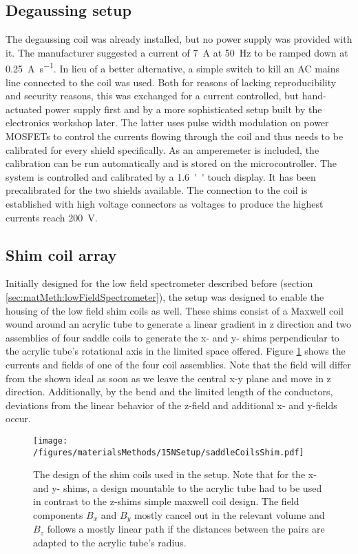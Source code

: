         \subsection{Degaussing setup}
        \label{sec:matMeth:degaussing}
        The degaussing coil was already installed, but no power supply was provided with it. The manufacturer suggested a current of \SI{7}{\ampere} at \SI{50}{\hertz} to be ramped down at \SI{0.25}{\ampere\per\second}. In lieu of a better alternative, a simple switch to kill an AC mains line connected to the coil was used. Both for reasons of lacking reproducibility and security reasons, this was exchanged for a current controlled, but hand-actuated power supply first and by a more sophisticated setup built by the electronics workshop later. The latter uses pulse width modulation on power MOSFETs to control the currents flowing through the coil and thus needs to be calibrated for every shield specifically. As an amperemeter is included, the calibration can be run automatically and is stored on the microcontroller. The system is controlled and calibrated by a \SI{1.6}{''} touch display. It has been precalibrated for the two shields available. The connection to the coil is established with high voltage connectors as voltages to produce the highest currents reach \SI{200}{\volt}.
        \subsection{Shim coil array}
        Initially designed for the low field spectrometer described before (section \ref{sec:matMeth:lowFieldSpectrometer}), the setup was designed to enable the housing of the low field shim coils as well. These shims consist of a Maxwell coil wound around an acrylic tube to generate a linear gradient in z direction and two assemblies of four saddle coils to generate the x- and y- shims perpendicular to the acrylic tube's rotational axis in the limited space offered.
        Figure \ref{figure:matMeth:shimCoilArray} shows the currents and fields of one of the four coil assemblies. Note that the field will differ from the shown ideal as soon as we leave the central x-y plane and move in z direction. Additionally, by the bend and the limited length of the conductors, deviations from the linear behavior of the z-field and additional x- and y-fields occur.
        \begin{figure}
            \texttt{[image: /figures/materialsMethods/15NSetup/saddleCoilsShim.pdf]}
            \caption[Shim coil design]{The design of the shim coils used in the setup. Note that for the x- and y- shims, a design mountable to the acrylic tube had to be used in contrast to the z-shims simple maxwell coil design. The field components $B_x$ and $B_y$ mostly cancel out in the relevant volume and $B_z$ follows a mostly linear path if the distances between the pairs are adapted to the acrylic tube's radius.}
            \label{figure:matMeth:shimCoilArray}
        \end{figure}
